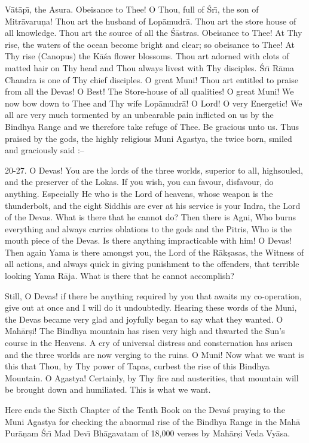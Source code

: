 V\=at\=ap\={\i}, the Asura. Obeisance to Thee! O Thou, full of \'Sr\={\i}, the son of Mitr\=avaru\d{n}a! Thou art the husband of Lop\=amudr\=a. Thou art the store house of all knowledge. Thou art the source of all the \'S\=astras. Obeisance to Thee! At Thy rise, the waters of the ocean become bright and clear; so obeisance to Thee! At Thy rise (Canopus) the K\=a\'sa flower blossoms. Thou art adorned with clots of matted hair on Thy head and Thou always livest with Thy disciples. \'Sr\={\i} R\=ama Chandra is one of Thy chief disciples. O great Muni! Thou art entitled to praise from all the Devas! O Best! The Store-house of all qualities! O great Muni! We now bow down to Thee and Thy wife Lop\=amudr\=a! O Lord! O very Energetic! We all are very much tormented by an unbearable pain inflicted on us by the Bindhya Range and we therefore take refuge of Thee. Be gracious unto us. Thus praised by the gods, the highly religious Muni Agastya, the twice born, smiled and graciously said :--

20-27. O Devas! You are the lords of the three worlds, superior to all, highsouled, and the preserver of the Lokas. If you wish, you can favour, disfavour, do anything. Especially He who is the Lord of heavens, whose weapon is the thunderbolt, and the eight Siddhis are ever at his service is your Indra, the Lord of the Devas. What is there that he cannot do? Then there is Agni, Who burns everything and always carries oblations to the gods and the Pitris, Who is the mouth piece of the Devas. Is there anything impracticable with him! O Devas! Then again Yama is there amongst you, the Lord of the R\=ak\d{s}asas, the Witness of all actions, and always quick in giving punishment to the offenders, that terrible looking Yama R\=aja. What is there that he cannot accomplish?

Still, O Devas! if there be anything required by you that awaits my co-operation, give out at once and I will do it undoubtedly. Hearing these words of the Muni, the Devas became very glad and joyfully began to say what they wanted. O Mah\=ar\d{s}i! The Bindhya mountain has risen very high and thwarted the Sun's course in the Heavens. A cry of universal distress and consternation has arisen and the three worlds are now verging to the ruins. O Muni! Now what we want is this that Thou, by Thy power of Tapas, curbest the rise of this Bindhya Mountain. O Agastya! Certainly, by Thy fire and austerities, that mountain will be brought down and humiliated. This is what we want.

Here ends the Sixth Chapter of the Tenth Book on the Deva\'s praying to the Muni Agastya for checking the abnormal rise of the Bindhya Range in the Mah\=a Pur\=a\d{n}am \'Sr\={\i} Mad Dev\={\i} Bh\=agavatam of 18,000 verses by Mah\=ar\d{s}i Veda Vy\=asa.



